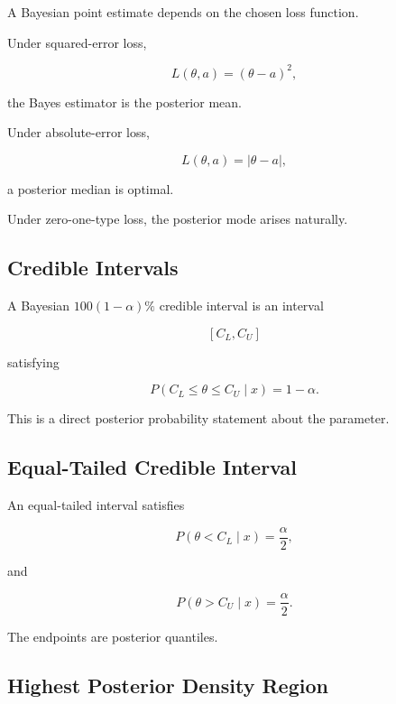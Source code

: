 A Bayesian point estimate depends on the chosen loss function.

Under squared-error loss,

\[
\boxed{
L(\theta,a)
=
(\theta-a)^2,
}
\]

the Bayes estimator is the posterior mean.

Under absolute-error loss,

\[
\boxed{
L(\theta,a)
=
|\theta-a|,
}
\]

a posterior median is optimal.

Under zero-one-type loss, the posterior mode arises naturally.

\subsection{Credible Intervals}
\label{subsec:credible-intervals}

A Bayesian \(100(1-\alpha)\%\) credible interval is an interval

\[
[C_L,C_U]
\]

satisfying

\[
\boxed{
P
(
C_L\leq\theta\leq C_U
\mid x
)
=
1-\alpha.
}
\]

This is a direct posterior probability statement about the parameter.

\subsection{Equal-Tailed Credible Interval}
\label{subsec:equal-tailed-credible-interval}

An equal-tailed interval satisfies

\[
\boxed{
P
(
\theta<C_L
\mid x
)
=
\frac{\alpha}{2},
}
\]

and

\[
\boxed{
P
(
\theta>C_U
\mid x
)
=
\frac{\alpha}{2}.
}
\]

The endpoints are posterior quantiles.

\subsection{Highest Posterior Density Region}
\label{subsec:highest-posterior-density}

